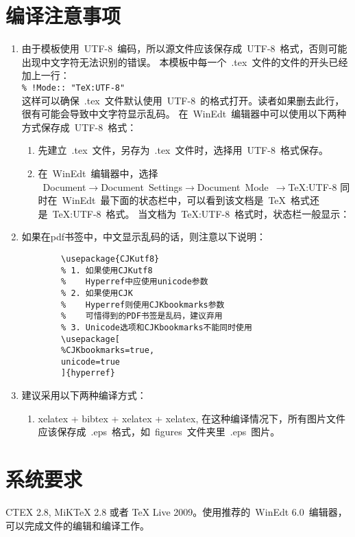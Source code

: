 \section{编译注意事项}
\begin{enumerate}
  \item 由于模板使用~UTF-8~编码，所以源文件应该保存成~UTF-8~格式，否则可能出现中文字符无法识别的错误。
  本模板中每一个~.tex~文件的文件的开头已经加上一行：\\
  \verb|% !Mode:: "TeX:UTF-8"|\\
     这样可以确保~.tex~文件默认使用~UTF-8~的格式打开。读者如果删去此行，很有可能会导致中文字符显示乱码。
     在~WinEdt~编辑器中可以使用以下两种方式保存成~UTF-8~格式：
      \begin{enumerate}
        \item 先建立~.tex~文件，另存为~.tex~文件时，选择用~UTF-8~格式保存。
        \item
            在~WinEdt~编辑器中，选择\\
            \mbox{~Document$\to$Document Settings$\to$Document Mode $\to$TeX:UTF-8} 同时在~WinEdt~最下面的状态栏中，可以看到该文档是~TeX~格式还是~TeX:UTF-8~格式。
            当文档为~TeX:UTF-8~格式时，状态栏一般显示：
      \end{enumerate}
  \item 如果在pdf书签中，中文显示乱码的话，则注意以下说明：
    \begin{verbatim}
        \usepackage{CJKutf8}
        % 1. 如果使用CJKutf8
        %    Hyperref中应使用unicode参数
        % 2. 如果使用CJK
        %    Hyperref则使用CJKbookmarks参数
        %    可惜得到的PDF书签是乱码，建议弃用
        % 3. Unicode选项和CJKbookmarks不能同时使用
        \usepackage[
        %CJKbookmarks=true,
        unicode=true
        ]{hyperref}
     \end{verbatim}
  \item 建议采用以下两种编译方式：
  \begin{enumerate}
    \item xelatex + bibtex + xelatex + xelatex, 在这种编译情况下，所有图片文件应该保存成~.eps~格式，如~figures~文件夹里~.eps~图片。
  \end{enumerate}
\end{enumerate}

\section{系统要求}
    CTEX 2.8, MiKTeX 2.8 或者 TeX Live 2009。使用推荐的~WinEdt 6.0~编辑器，可以完成文件的编辑和编译工作。

